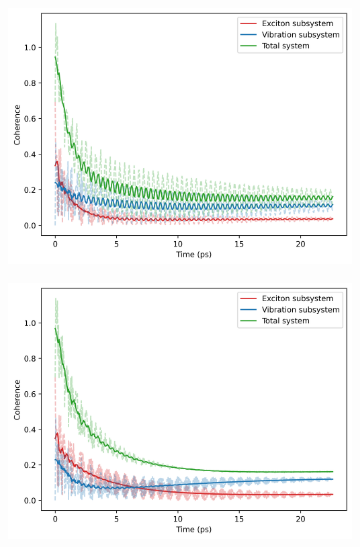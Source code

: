 \documentclass[11pt]{article}
\begin{document}
\begin{figure}[H]
    \centering
    \begin{subfigure}{0.45\textwidth}
        \centering
        \includegraphics[width=\linewidth]{Research Project/Code/results/ExVib/Open/Coherence/coh_spont_eg.png}
        \caption{}
        \label{fig:EVM_OQS_Coh_spont_eg}
    \end{subfigure}
    \hfill
    \begin{subfigure}{0.45\textwidth}
        \centering
        \includegraphics[width=\linewidth]{Research Project/Code/results/ExVib/Open/Coherence/coh_therm_eg.png}
        \caption{}
        \label{fig:EVM_OQS_Coh_therm_eg}
    \end{subfigure}
    

\end{figure}
\end{document}

